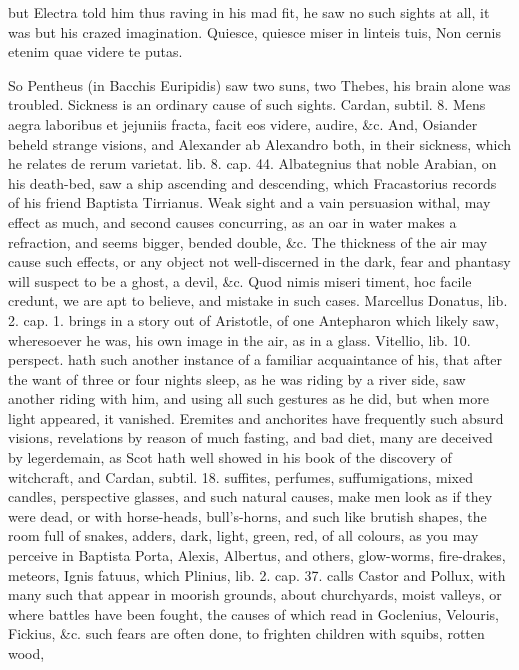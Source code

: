 {but Electra told him thus raving in his mad fit, he saw no such sights
at all, it was but his crazed imagination.
Quiesce, quiesce miser in linteis tuis,
Non cernis etenim quae videre te putas.

So Pentheus (in Bacchis Euripidis) saw two suns, two Thebes, his brain
alone was troubled. Sickness is an ordinary cause of such sights.
Cardan, subtil. 8. Mens aegra laboribus et jejuniis fracta, facit eos
videre, audire, \&c. And, Osiander beheld strange visions, and Alexander
ab Alexandro both, in their sickness, which he relates de rerum
varietat. lib. 8. cap. 44. Albategnius that noble Arabian, on his
death-bed, saw a ship ascending and descending, which Fracastorius
records of his friend Baptista Tirrianus. Weak sight and a vain
persuasion withal, may effect as much, and second causes concurring, as
an oar in water makes a refraction, and seems bigger, bended double,
\&c. The thickness of the air may cause such effects, or any object not
well-discerned in the dark, fear and phantasy will suspect to be a
ghost, a devil, \&c. Quod nimis miseri timent, hoc facile credunt,
we are apt to believe, and mistake in such cases. Marcellus Donatus,
lib. 2. cap. 1. brings in a story out of Aristotle, of one Antepharon
which likely saw, wheresoever he was, his own image in the air, as in a
glass. Vitellio, lib. 10. perspect. hath such another instance of a
familiar acquaintance of his, that after the want of three or four
nights sleep, as he was riding by a river side, saw another riding with
him, and using all such gestures as he did, but when more light
appeared, it vanished. Eremites and anchorites have frequently such
absurd visions, revelations by reason of much fasting, and bad diet,
many are deceived by legerdemain, as Scot hath well showed in his book
of the discovery of witchcraft, and Cardan, subtil. 18. suffites,
perfumes, suffumigations, mixed candles, perspective glasses, and such
natural causes, make men look as if they were dead, or with
horse-heads, bull's-horns, and such like brutish shapes, the room full
of snakes, adders, dark, light, green, red, of all colours, as you may
perceive in Baptista Porta, Alexis, Albertus, and others, glow-worms,
fire-drakes, meteors, Ignis fatuus, which Plinius, lib. 2. cap. 37.
calls Castor and Pollux, with many such that appear in moorish grounds,
about churchyards, moist valleys, or where battles have been fought,
the causes of which read in Goclenius, Velouris, Fickius, \&c. such
fears are often done, to frighten children with squibs, rotten wood,
}
